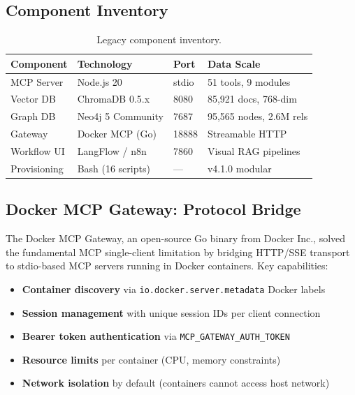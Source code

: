 \documentclass[11pt,letterpaper]{article}
\begin{document}
\subsection{Component Inventory}

\begin{table}[H]
\centering
\footnotesize
\begin{tabular}{@{}llll@{}}
\toprule
\textbf{Component} & \textbf{Technology} & \textbf{Port} & \textbf{Data Scale} \\
\midrule
MCP Server & Node.js 20 & stdio & 51 tools, 9 modules \\
Vector DB & ChromaDB 0.5.x & 8080 & 85,921 docs, 768-dim \\
Graph DB & Neo4j 5 Community & 7687 & 95,565 nodes, 2.6M rels \\
Gateway & Docker MCP (Go) & 18888 & Streamable HTTP \\
Workflow UI & LangFlow / n8n & 7860 & Visual RAG pipelines \\
Provisioning & Bash (16 scripts) & --- & v4.1.0 modular \\
\bottomrule
\end{tabular}
\caption{Legacy component inventory.}
\label{tab:legacy-components}
\end{table}

\subsection{Docker MCP Gateway: Protocol Bridge}

The Docker MCP Gateway, an open-source Go binary from Docker Inc., solved
the fundamental MCP single-client limitation by bridging HTTP/SSE transport
to stdio-based MCP servers running in Docker containers. Key capabilities:

\begin{itemize}[noitemsep]
    \item \textbf{Container discovery} via \texttt{io.docker.server.metadata} Docker labels
    \item \textbf{Session management} with unique session IDs per client connection
    \item \textbf{Bearer token authentication} via \texttt{MCP\_GATEWAY\_AUTH\_TOKEN}
    \item \textbf{Resource limits} per container (CPU, memory constraints)
    \item \textbf{Network isolation} by default (containers cannot access host network)
\end{itemize}
\end{document}
